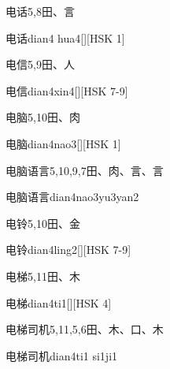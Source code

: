 \begin{Entry}{电话}{5,8}{⽥、⾔}
  \begin{Phonetics}{电话}{dian4 hua4}[][HSK 1]
  \end{Phonetics}
\end{Entry}

\begin{Entry}{电信}{5,9}{⽥、⼈}
  \begin{Phonetics}{电信}{dian4xin4}[][HSK 7-9]
  \end{Phonetics}
\end{Entry}

\begin{Entry}{电脑}{5,10}{⽥、⾁}
  \begin{Phonetics}{电脑}{dian4nao3}[][HSK 1]
  \end{Phonetics}
\end{Entry}

\begin{Entry}{电脑语言}{5,10,9,7}{⽥、⾁、⾔、⾔}
  \begin{Phonetics}{电脑语言}{dian4nao3yu3yan2}
  \end{Phonetics}
\end{Entry}

\begin{Entry}{电铃}{5,10}{⽥、⾦}
  \begin{Phonetics}{电铃}{dian4ling2}[][HSK 7-9]
  \end{Phonetics}
\end{Entry}

\begin{Entry}{电梯}{5,11}{⽥、⽊}
  \begin{Phonetics}{电梯}{dian4ti1}[][HSK 4]
  \end{Phonetics}
\end{Entry}

\begin{Entry}{电梯司机}{5,11,5,6}{⽥、⽊、⼝、⽊}
  \begin{Phonetics}{电梯司机}{dian4ti1 si1ji1}
  \end{Phonetics}
\end{Entry}

